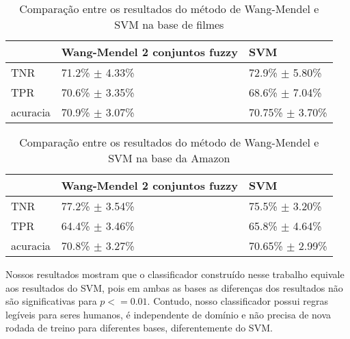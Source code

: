 \begin{table}[!h]
    \begin{tabular}{lll}
    ~         			& Wang-Mendel 2 conjuntos fuzzy						& SVM \\ \hline
    TNR 				& 71.2\% $\pm$ 4.33\%            								& 72.9\% $\pm$ 5.80\%    \\
    TPR    			& 70.6\% $\pm$ 3.35\%     									& 68.6\% $\pm$ 7.04\%   \\
    acuracia  		& 70.9\% $\pm$ 3.07\%             							& 70.75\% $\pm$ 3.70\%    \\
    \end{tabular}
    \caption{Comparação entre os resultados do método de Wang-Mendel e SVM na base de filmes}
	\label{table:movies_svm}
\end{table}

%
%
%

\begin{table}[!h]
    \begin{tabular}{lll}
    ~         				& Wang-Mendel 2 conjuntos fuzzy 							& SVM \\ \hline
    TNR 			     	& 77.2\% $\pm$ 3.54\%            									& 75.5\% $\pm$ 3.20\%    \\
    TPR    			   	& 64.4\% $\pm$ 3.46\%   											& 65.8\% $\pm$ 4.64\%   \\
    acuracia  		   & 70.8\% $\pm$ 3.27\%       										& 70.65\% $\pm$ 2.99\%    \\
    \end{tabular}
    \caption{Comparação entre os resultados do método de Wang-Mendel e SVM na base da Amazon}
	\label{table:amazon_svm}
\end{table}

%
%
%

Nossos resultados mostram que o classificador construído nesse trabalho equivale aos resultados do SVM, pois em ambas as bases as diferenças dos resultados não são significativas para $p <= 0.01$. Contudo, nosso classificador possui regras legíveis para seres humanos, é independente de domínio e não precisa de nova rodada de treino para diferentes bases, diferentemente do SVM.